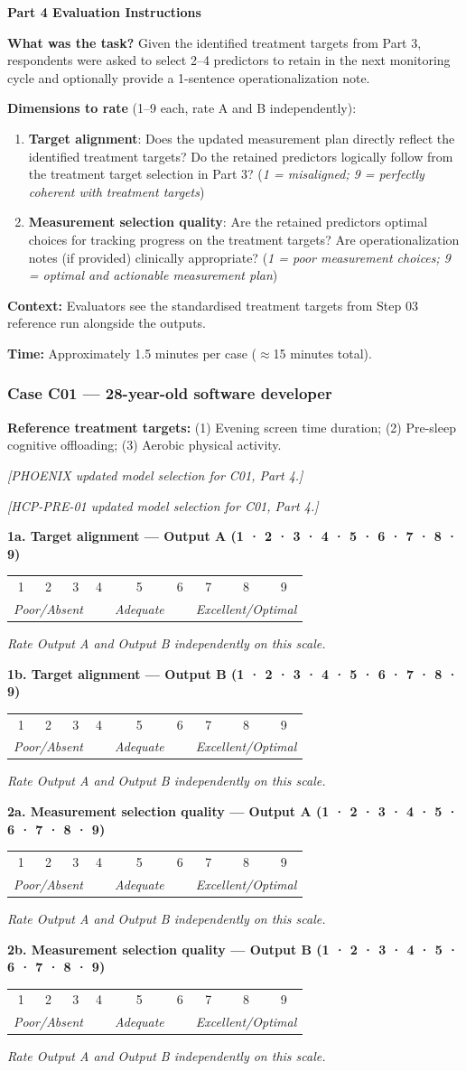 \documentclass[11pt,a4paper]{article}
\makeatletter
\newcommand{\likertscale}[1]{%
\par\vspace{0.15em}%
\noindent\begin{tcolorbox}[colback=ScaleBG,colframe=BorderGrey,boxrule=0.4pt,arc=1mm,left=5pt,right=5pt,top=4pt,bottom=4pt]%
\small\textbf{\color{SlateMid}#1}\\[0.25em]%
\begin{tabular}{@{}*{9}{c}@{}}%
1 & 2 & 3 & 4 & 5 & 6 & 7 & 8 & 9 \\%
\multicolumn{3}{l}{\tiny\itshape Poor/Absent} & & \multicolumn{1}{c}{\tiny\itshape Adequate} & & \multicolumn{3}{r}{\tiny\itshape Excellent/Optimal}%
\end{tabular}%
\quad\textit{Rate Output A and Output B independently on this scale.}%
\end{tcolorbox}\vspace{0.1em}}
\makeatother
\begin{document}
\begin{tcolorbox}[colback=PartFourBG,colframe=RichPurple,arc=2.5mm,boxrule=0.9pt,left=10pt,right=10pt,top=9pt,bottom=9pt]
\textbf{\color{RichPurple}Part 4 Evaluation Instructions}

\smallskip
\textbf{What was the task?} Given the identified treatment targets from Part 3, respondents were asked to select 2--4 predictors to retain in the next monitoring cycle and optionally provide a 1-sentence operationalization note.

\textbf{Dimensions to rate} (1--9 each, rate A and B independently):
\begin{enumerate}
\item \textbf{Target alignment}: Does the updated measurement plan directly reflect the identified treatment targets? Do the retained predictors logically follow from the treatment target selection in Part 3? (\textit{1 = misaligned; 9 = perfectly coherent with treatment targets})
\item \textbf{Measurement selection quality}: Are the retained predictors optimal choices for tracking progress on the treatment targets? Are operationalization notes (if provided) clinically appropriate? (\textit{1 = poor measurement choices; 9 = optimal and actionable measurement plan})
\end{enumerate}

\textbf{Context:} Evaluators see the standardised treatment targets from Step 03 reference run alongside the outputs.

\textbf{Time:} Approximately 1.5 minutes per case ($\approx$15 minutes total).
\end{tcolorbox}

\vspace{0.5em}

\subsubsection*{Case C01 --- 28-year-old software developer}
\begin{vignettebox}
\small\textbf{Reference treatment targets:} (1) Evening screen time duration; (2) Pre-sleep cognitive offloading; (3) Aerobic physical activity.
\end{vignettebox}
\begin{outputAbox}\small\textit{[PHOENIX updated model selection for C01, Part 4.]}\end{outputAbox}
\begin{outputBbox}\small\textit{[HCP-PRE-01 updated model selection for C01, Part 4.]}\end{outputBbox}
\begin{ratingbox}
\likertscale{1a. \textbf{Target alignment} --- Output A \hfill (1 · 2 · 3 · 4 · 5 · 6 · 7 · 8 · 9)}
\likertscale{1b. \textbf{Target alignment} --- Output B \hfill (1 · 2 · 3 · 4 · 5 · 6 · 7 · 8 · 9)}
\likertscale{2a. \textbf{Measurement selection quality} --- Output A \hfill (1 · 2 · 3 · 4 · 5 · 6 · 7 · 8 · 9)}
\likertscale{2b. \textbf{Measurement selection quality} --- Output B \hfill (1 · 2 · 3 · 4 · 5 · 6 · 7 · 8 · 9)}
\end{ratingbox}
\end{document}
